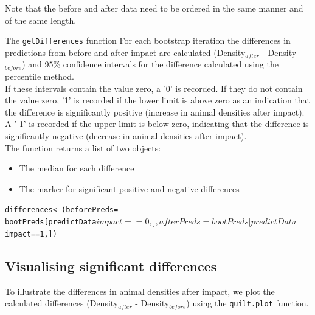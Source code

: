\noindent Note that the before and after data need to be ordered in the same manner and of the same length. 

\begin{block}{The {\tt getDifferences} function}
For each bootstrap iteration the differences in predictions from before and after impact are calculated (Density$_{after}$ - Density$_{before}$) and 95\% confidence intervals for the difference calculated using the percentile method. \\

\noindent If these intervals contain the value zero, a '0' is recorded. If they do not contain the value zero, '1' is recorded if the lower limit is above zero as an indication that the difference is significantly positive (increase in animal densities after impact). A '-1' is recorded if the upper limit is below zero, indicating that the difference is significantly negative (decrease in animal densities after impact). \\
The function returns a list of two objects: 
\begin{itemize}
\item{The median for each difference}
\item{The marker for significant positive and negative differences}
\end{itemize}
\end{block}


\begin{knitrout}\footnotesize
{}\color{fgcolor}\begin{kframe}
\begin{alltt}
differences <- (beforePreds = 
        bootPreds[predictData$impact == 0, ], 
        afterPreds = bootPreds[predictData$impact == 1, ])
\end{alltt}
\end{kframe}
\end{knitrout}


\subsection{Visualising significant differences}
To illustrate the differences in animal densities after impact, we plot the calculated differences (Density$_{after}$ - Density$_{before}$) using the {\tt quilt.plot} function.\\

